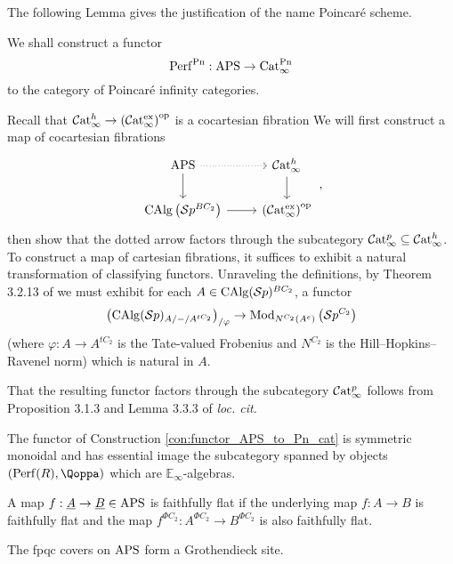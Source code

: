 The following Lemma gives the justification of the name Poincar{\'e} scheme.
\begin{con}\label{con:functor_APS_to_Pn_cat}
    We shall construct a functor \[\mathrm{Perf}^{\mathrm{Pn}}:\mathrm{APS}\to \mathrm{Cat}_{\infty}^{\mathrm{Pn}}\] to the category of Poincar{\'e} infinity categories. 

    Recall that $ \mathcal{C}\mathrm{at}^h_\infty \to \left(\mathcal{C}\mathrm{at}^\mathrm{ex}_\infty\right)^{\mathrm{op}} $ is a cocartesian fibration \cite[\S1.4.]{CDHHLMNNSI} 
    We will first construct a map of cocartesian fibrations
    \begin{equation}
    \begin{tikzcd}
        \aps \ar[r,dotted] \ar[d] & \Cat^h_\infty \ar[d] \\
        \calg\left(\Sp^{BC_2}\right)\ar[r] & \left(\Cat^\mathrm{ex}_\infty\right)^\op  
    \end{tikzcd}\,,
    \end{equation}
    then show that the dotted arrow factors through the subcategory $ \mathcal{C}\mathrm{at}^p_\infty \subseteq \mathcal{C}\mathrm{at}^h_\infty $. 
    To construct a map of cartesian fibrations, it suffices to exhibit a natural transformation of classifying functors. 
    Unraveling the definitions, by Theorem 3.2.13 of \cite{CDHHLMNNSI} we must exhibit for each $ A \in \operatorname{CAlg}(\mathcal{S}p)^{BC_2} $, a functor
    \begin{equation}
        \left(\operatorname{CAlg}(\mathcal{S}p)_{A/-/A^{tC_2}}\right)_{/\varphi} \to \mathrm{Mod}_{N^{C_2}(A^e)}\left(\mathcal{S}p^{C_2}\right)
    \end{equation}
    (where $ \varphi \colon A \to A^{tC_2} $ is the Tate-valued Frobenius and $ N^{C_2} $ is the Hill--Hopkins--Ravenel norm) which is natural in $ A $. 

    That the resulting functor factors through the subcategory $ \mathcal{C}\mathrm{at}^p_\infty $ follows from Proposition 3.1.3 and Lemma 3.3.3 of \emph{loc. cit.}
\end{con}
\begin{lem}
    The functor of Construction \ref{con:functor_APS_to_Pn_cat} is symmetric monoidal and has essential image the subcategory spanned by objects $(\perf(R),\Qoppa)$ which are $\mathbb{E}_\infty$-algebras.
\end{lem}

\begin{defn}
     A map $f:\underline{A}\to \underline{B}\in \mathrm{APS}$ is faithfully flat if the underlying map $f:A\to B$ is faithfully flat and the map $f^{\Phi C_2}:A^{\Phi C_2}\to B^{\Phi C_2}$ is also faithfully flat.
\end{defn}

\begin{lem}
    The fpqc covers on $\mathrm{APS}$ form a Grothendieck site. 
\end{lem}


